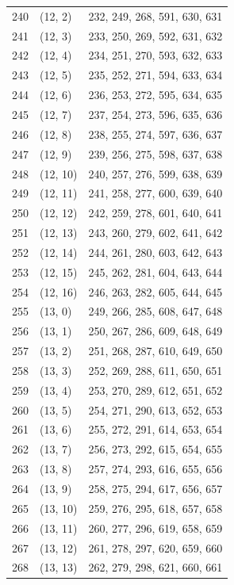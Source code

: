 \documentclass{article}
\begin{document}
\begin{longtable}{lll}
  240 & (12, 2) & 232, 249, 268, 591, 630, 631 \\
  241 & (12, 3) & 233, 250, 269, 592, 631, 632 \\
  242 & (12, 4) & 234, 251, 270, 593, 632, 633 \\
  243 & (12, 5) & 235, 252, 271, 594, 633, 634 \\
  244 & (12, 6) & 236, 253, 272, 595, 634, 635 \\
  245 & (12, 7) & 237, 254, 273, 596, 635, 636 \\
  246 & (12, 8) & 238, 255, 274, 597, 636, 637 \\
  247 & (12, 9) & 239, 256, 275, 598, 637, 638 \\
  248 & (12, 10) & 240, 257, 276, 599, 638, 639 \\
  249 & (12, 11) & 241, 258, 277, 600, 639, 640 \\
  250 & (12, 12) & 242, 259, 278, 601, 640, 641 \\
  251 & (12, 13) & 243, 260, 279, 602, 641, 642 \\
  252 & (12, 14) & 244, 261, 280, 603, 642, 643 \\
  253 & (12, 15) & 245, 262, 281, 604, 643, 644 \\
  254 & (12, 16) & 246, 263, 282, 605, 644, 645 \\
  255 & (13, 0) & 249, 266, 285, 608, 647, 648 \\
  256 & (13, 1) & 250, 267, 286, 609, 648, 649 \\
  257 & (13, 2) & 251, 268, 287, 610, 649, 650 \\
  258 & (13, 3) & 252, 269, 288, 611, 650, 651 \\
  259 & (13, 4) & 253, 270, 289, 612, 651, 652 \\
  260 & (13, 5) & 254, 271, 290, 613, 652, 653 \\
  261 & (13, 6) & 255, 272, 291, 614, 653, 654 \\
  262 & (13, 7) & 256, 273, 292, 615, 654, 655 \\
  263 & (13, 8) & 257, 274, 293, 616, 655, 656 \\
  264 & (13, 9) & 258, 275, 294, 617, 656, 657 \\
  265 & (13, 10) & 259, 276, 295, 618, 657, 658 \\
  266 & (13, 11) & 260, 277, 296, 619, 658, 659 \\
  267 & (13, 12) & 261, 278, 297, 620, 659, 660 \\
  268 & (13, 13) & 262, 279, 298, 621, 660, 661 \\

\end{longtable}
\end{document}
